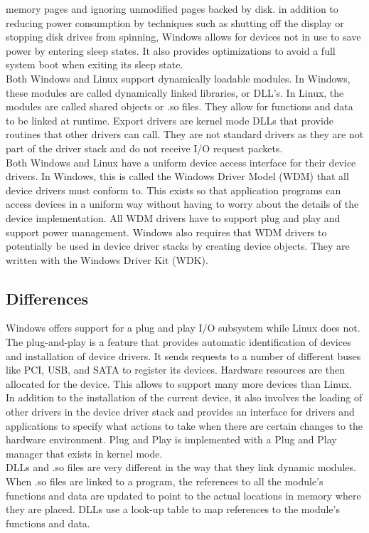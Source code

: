 \documentclass[letterpaper,10pt,titlepage]{article}
\begin{document}
memory pages and ignoring unmodified pages backed by disk. in addition to 
reducing power consumption by techniques such as shutting off the display or 
stopping disk drives from spinning, Windows allows for devices not in use 
to save power by entering sleep states. It also provides optimizations
to avoid a full system boot when exiting its sleep state.
\\
\linebreak
Both Windows and Linux support dynamically loadable modules. In Windows, these
modules are called dynamically linked libraries, or DLL's. In Linux, the 
modules are called shared objects or .so files. They allow for functions and 
data to be linked at runtime. Export drivers are kernel mode DLLs that 
provide routines that other drivers can call. They are not standard drivers
as they are not part of the driver stack and do not receive I/O request 
packets.
\\
\linebreak
Both Windows and Linux have a uniform device access interface for their 
device drivers. In Windows, this is called the Windows Driver Model (WDM) 
that all device drivers must conform to. This exists so that application 
programs can access devices in a uniform way without having to worry about
the details of the device implementation. All WDM drivers have to support 
plug and play and support power management. Windows also requires that 
WDM drivers to potentially be used in device driver stacks by creating 
device objects. They are written with the Windows Driver Kit (WDK).
\subsection{Differences}
Windows offers support for a plug and play I/O subsystem while Linux does not.
The plug-and-play is a feature that provides automatic identification of 
devices and installation of device drivers. It sends requests to a number of
different buses like PCI, USB, and SATA to register its devices. Hardware 
resources are then allocated for the device. This allows to support many more
devices than Linux. In addition to the installation of the current device, 
it also involves the loading of other drivers in the device driver stack
and provides an interface for drivers and applications to specify what 
actions to take when there are certain changes to the hardware environment.
Plug and Play is implemented with a Plug and Play manager that exists in 
kernel mode.
\\
\linebreak
DLLs and .so files are very different in the way that they link dynamic 
modules. When .so files are linked to a program, the references to all the 
module's functions and data are updated to point to the actual locations in 
memory where they are placed. DLLs use a look-up table to map references to 
the module's functions and data.
\end{document}
